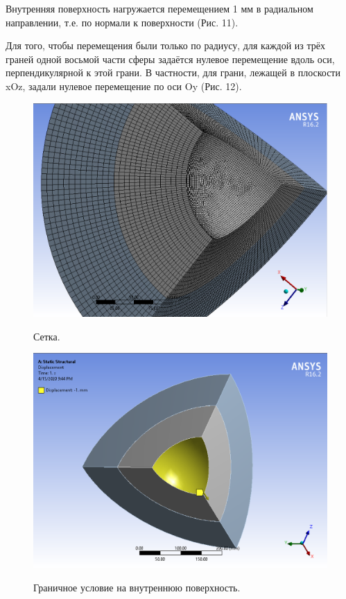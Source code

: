 \documentclass[a4paper,12pt]{article}	%
\begin{document}
Внутренняя поверхность нагружается перемещением 1 мм в радиальном направлении, т.е. по нормали к поверхности (Рис. 11).

Для того, чтобы перемещения были только по радиусу, для каждой из трёх граней одной восьмой части сферы задаётся нулевое перемещение вдоль оси, перпендикулярной к этой грани. В частности, для грани, лежащей в плоскости xOz, задали нулевое перемещение по оси Oy (Рис. 12).

\begin{figure}[H]
  \centering
  \includegraphics[scale=0.45]{img/Mesh.png}\\
  \caption{Сетка.}
  \label{fig_10}
\end{figure}

\begin{figure}[H]
  \centering
  \includegraphics[scale=0.5]{img/Displacement.png}\\
  \caption{Граничное условие на внутреннюю поверхность.}
  \label{fig_11}
\end{figure}
\end{document}
